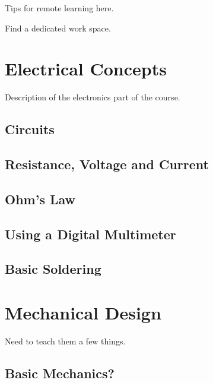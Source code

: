 \documentclass[
]{book}
\begin{document}
Tips for remote learning here.

Find a dedicated work space.

\hypertarget{electrical-concepts}{%
\chapter{Electrical Concepts}\label{electrical-concepts}}

Description of the electronics part of the course.

\hypertarget{circuits}{%
\section{Circuits}\label{circuits}}

\hypertarget{resistance-voltage-and-current}{%
\section{Resistance, Voltage and Current}\label{resistance-voltage-and-current}}

\hypertarget{ohms-law}{%
\section{Ohm's Law}\label{ohms-law}}

\hypertarget{using-a-digital-multimeter}{%
\section{Using a Digital Multimeter}\label{using-a-digital-multimeter}}

\hypertarget{basic-soldering}{%
\section{Basic Soldering}\label{basic-soldering}}

\hypertarget{mechanical-design}{%
\chapter{Mechanical Design}\label{mechanical-design}}

Need to teach them a few things.

\hypertarget{basic-mechanics}{%
\section{Basic Mechanics?}\label{basic-mechanics}}
\end{document}
